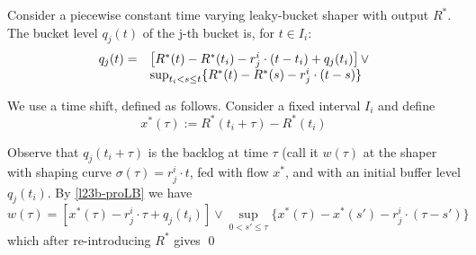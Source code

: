 \begin{proposition}
 Consider a piecewise constant time varying
leaky-bucket shaper with output $R^*$. The bucket level $q_j(t)$
of the j-th bucket is, for $t \in I_i$:
\begin{equation}
\mylabel{l23b-q}
  \begin{array}{rl}
    q_j(t)= &\left[ R^*(t)-R^*(t_i)-r_j^i \cdot(t-t_i)+q_j(t_i) \right]
 \vee  \\
     & \sup_{t_i < s\leq t}
              \{R^*(t)-R^*(s)-r_j^i \cdot(t-s)\}
  \end{array}
\end{equation}
\end{proposition}
\pr
We use a time shift, defined as follows. Consider a fixed interval
$I_i$ and define
$$x^*(\tau):=R^*(t_i + \tau) - R^*(t_i)$$

Observe that $q_j(t_i+\tau)$ is the backlog at time $\tau$ (call
it $w(\tau)$ at the shaper with shaping curve $\sigma(\tau)=r_j^i
\cdot t$, fed with flow $x^*$, and with an initial buffer level
$q_j(t_i)$. By \cref{l23b-proLB} we have
 $$
w(\tau)=\left[x^*(\tau)-r_j^i \cdot \tau + q_j(t_i) \right] \vee
\sup_{0 <s'\leq \tau}
                \{x^*(\tau)-x^*(s')-r_j^i \cdot(\tau-s')\}
 $$
 which after re-introducing $R^*$ gives 
 \qed

